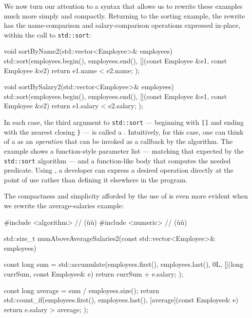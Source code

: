 We now turn our attention to a syntax that allows us to rewrite these
examples much more simply and compactly. Returning to the sorting
example, the rewrite has the name-comparison and salary-comparison
operations expressed in-place, within the call to \lstinline!std::sort!:

\begin{emcppslisting}
void sortByName2(std::vector<Employee>& employees)
{
    std::sort(employees.begin(), employees.end(),
              [](const Employee &e1, const Employee &e2)
              {
                  return e1.name < e2.name;
              });
}

void sortBySalary2(std::vector<Employee>& employees)
{
    std::sort(employees.begin(), employees.end(),
              [](const Employee &e1, const Employee &e2)
              {
                  return e1.salary < e2.salary;
              });
}
\end{emcppslisting}
    

In each case, the third argument to \lstinline!std::sort! --- beginning
with \lstinline![]! and ending with the nearest closing \lstinline!}! --- is called a
. Intuitively, for this case, one can think of
a  as an \emph{operation} that can be invoked
as a callback by the algorithm. The example shows a function-style
parameter list --- matching that expected by the \lstinline!std::sort!
algorithm --- and a function-like body that computes the needed
predicate. Using , a developer can express a
desired operation directly at the point of use rather than defining it
elsewhere in the program.

The compactness and simplicity afforded by the use of  is even more evident when we rewrite the average-salaries
example:

\begin{emcppslisting}
#include <algorithm>  // (ù{}ù)
#include <numeric>    // (ù{}ù)

std::size_t numAboveAverageSalaries2(const std::vector<Employee>& employees)
{
    const long sum = std::accumulate(employees.first(), employees.last(), 0L,
                                     [](long currSum, const Employee& e)
                                     {
                                         return currSum + e.salary;
                                     });

    const long average = sum / employees.size();
    return std::count_if(employees.first(), employees.last(),
                         [average](const Employee& e)
                         {
                             return e.salary > average;
                         });
}
\end{emcppslisting}
    

